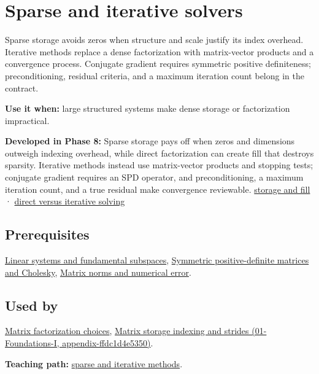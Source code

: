 \hypertarget{appendix-67c87a3d9e94}{}
\section{Sparse and iterative solvers}\label{appendix-67c87a3d9e94-sparse-and-iterative-solvers}

Sparse storage avoids zeros when structure and scale justify its index overhead. Iterative methods replace a dense factorization with matrix-vector products and a convergence process. Conjugate gradient requires symmetric positive definiteness; preconditioning, residual criteria, and a maximum iteration count belong in the contract.

\textbf{Use it when:} large structured systems make dense storage or factorization impractical.

\textbf{Developed in Phase 8:} Sparse storage pays off when zeros and dimensions outweigh indexing overhead, while direct factorization can create fill that destroys sparsity. Iterative methods instead use matrix-vector products and stopping tests; conjugate gradient requires an SPD operator, and preconditioning, a maximum iteration count, and a true residual make convergence reviewable. \hyperref[02-foundations-ii-ch038-sparse-storage-changes-the-cost-model]{storage and fill} · \hyperref[02-foundations-ii-ch038-direct-and-iterative-solvers-suit-different-workloads]{direct versus iterative solving}

\subsection{Prerequisites}\label{appendix-67c87a3d9e94-prerequisites}

\hyperref[appendix-8572a4a060c1]{Linear systems and fundamental subspaces}, \hyperref[appendix-50d2ea3c9b26]{Symmetric positive-definite matrices and Cholesky}, \hyperref[appendix-f8657bac66e5]{Matrix norms and numerical error}.

\subsection{Used by}\label{appendix-67c87a3d9e94-used-by}

\hyperref[appendix-221a483bec2d]{Matrix factorization choices}, \href{../01-Foundations-I/main.pdf\#nameddest=appendix-ffdc1d4e5350}{Matrix storage indexing and strides (01-Foundations-I, appendix-ffdc1d4e5350)}.

\textbf{Teaching path:} \hyperref[02-foundations-ii-ch038-sparse-problems-change-the-economics-of-solving]{sparse and iterative methods}.
